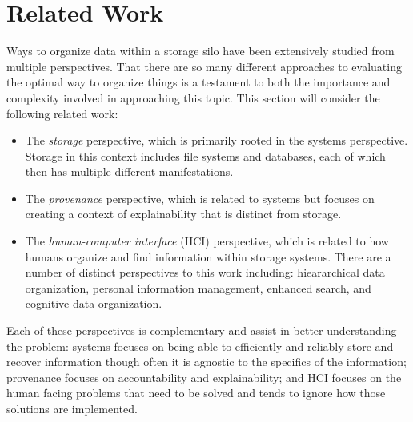 \section{Related Work}

Ways to organize data within a storage silo have been extensively
studied from multiple perspectives.  That there are so many different approaches
to evaluating the optimal way to organize things is a testament to both the
importance and complexity involved in approaching this topic.  This section will
consider the following related work:
\begin{itemize}
    \item The \textit{storage} perspective, which is primarily rooted in the
          systems perspective.  Storage in this context includes file systems and
          databases, each of which then has multiple different manifestations.

    \item The \textit{provenance} perspective, which is related to systems but
          focuses on creating a context of explainability that is distinct from
          storage.

    \item The \textit{human-computer interface} (HCI) perspective, which is related to
          how humans organize and find information within storage systems. There are a
          number of distinct perspectives to this work including: hieararchical
          data organization, personal information management, enhanced search, and
          cognitive data organization.
\end{itemize}

Each of these perspectives is complementary and assist in better understanding
the problem: systems focuses on being able to efficiently and reliably store and
recover information though often it is agnostic to the specifics of the
information; provenance focuses on accountability and explainability; and HCI
focuses on the human facing problems that need to be solved and tends to ignore
how those solutions are implemented.

\cite{mashwani2019360,9229638,vef2020delvefs,dourish2003the,harrison1996re,barreau1995finding,dourish1999getting,placeless-tois,giffordSFS,plan9,inversion,smartstore,tagfs,gfs,provsearch,uprove2,pindex,page1999pagerank,nfs,metastorage,howard1988scale,afs,Adya:2003:Farsite,unix,scfs,federatedMetaData,federatedACL,benet2014ipfs,guo2012burrito,mazurek2014toward,li2013horus,adya2002farsite,provprimer,camflow}

